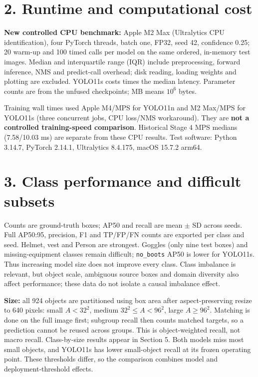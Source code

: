 \documentclass[10pt,a4paper]{article}
\begin{document}
\section*{2. Runtime and computational cost}
\begin{center}\small\end{center}
\textbf{New controlled CPU benchmark:} Apple M2 Max (Ultralytics CPU identification), four PyTorch threads, batch one, FP32, seed 42, confidence 0.25; 20 warm-up and 100 timed calls per model on the same ordered, in-memory test images. Median and interquartile range (IQR) include preprocessing, forward inference, NMS and predict-call overhead; disk reading, loading weights and plotting are excluded. YOLO11s costs \LatencyRatio{} times the median latency. Parameter counts are from the unfused checkpoints; MB means $10^6$ bytes.

Training wall times used Apple M4/MPS for YOLO11n and M2 Max/MPS for YOLO11s (three concurrent jobs, CPU loss/NMS workaround). They are \textbf{not a controlled training-speed comparison}. Historical Stage 4 MPS medians (7.58/10.03 ms) are separate from these CPU results. Test software: Python 3.14.7, PyTorch 2.14.1, Ultralytics 8.4.175, macOS 15.7.2 arm64.
\newpage
\section*{3. Class performance and difficult subsets}
\begin{center}\small\end{center}
Counts are ground-truth boxes; AP50 and recall are mean $\pm$ SD across seeds. Full AP50:95, precision, F1 and TP/FP/FN counts are exported per class and seed. Helmet, vest and Person are strongest. Goggles (only nine test boxes) and missing-equipment classes remain difficult; \texttt{no\_boots} AP50 is lower for YOLO11s. Thus increasing model size does not improve every class. Class imbalance is relevant, but object scale, ambiguous source boxes and domain diversity also affect performance; these data do not isolate a causal imbalance effect.
\begin{center}\small\end{center}
\textbf{Size:} all 924 objects are partitioned using box area after aspect-preserving resize to 640 pixels: small $A<32^2$, medium $32^2\leq A<96^2$, large $A\geq96^2$. Matching is done on the full image first; subgroup recall then counts matched targets, so a prediction cannot be reused across groups. This is object-weighted recall, not macro recall. Class-by-size results appear in Section 5. Both models miss most small objects, and YOLO11s has lower small-object recall at its frozen operating point. These thresholds differ, so the comparison combines model and deployment-threshold effects.
\end{document}
